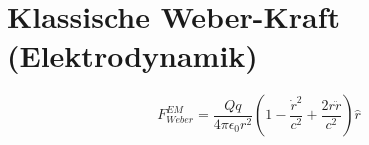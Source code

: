 \section{Klassische Weber-Kraft (Elektrodynamik)}
\[ F_{Weber}^{EM} = \frac{Qq}{4\pi\epsilon_0 r^2}\left(1 - \frac{\dot{r}^2}{c^2} + \frac{2r\ddot{r}}{c^2}\right)\hat{r} \]

